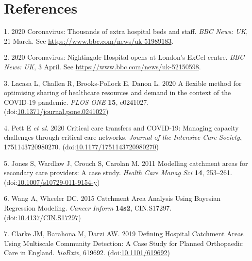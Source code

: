 \documentclass[
]{article}
\begin{document}
\hypertarget{references}{%
\section{References}\label{references}}

\hypertarget{refs}{}
\leavevmode\hypertarget{ref-CoronavirusThousandsExtra2020}{}%
1. 2020 Coronavirus: Thousands of extra hospital beds and staff.
\emph{BBC News: UK}, 21 March. See
\url{https://www.bbc.com/news/uk-51989183}.

\leavevmode\hypertarget{ref-CoronavirusNightingaleHospital2020}{}%
2. 2020 Coronavirus: Nightingale Hospital opens at London's ExCel
centre. \emph{BBC News: UK}, 3 April. See
\url{https://www.bbc.com/news/uk-52150598}.

\leavevmode\hypertarget{ref-lacasaFlexibleMethodOptimising2020}{}%
3. Lacasa L, Challen R, Brooks-Pollock E, Danon L. 2020 A flexible
method for optimising sharing of healthcare resources and demand in the
context of the COVID-19 pandemic. \emph{PLOS ONE} \textbf{15}, e0241027.
(doi:\href{https://doi.org/10.1371/journal.pone.0241027}{10.1371/journal.pone.0241027})

\leavevmode\hypertarget{ref-pettCriticalCareTransfers2020}{}%
4. Pett E \emph{et al.} 2020 Critical care transfers and COVID-19:
Managing capacity challenges through critical care networks.
\emph{Journal of the Intensive Care Society}, 1751143720980270.
(doi:\href{https://doi.org/10.1177/1751143720980270}{10.1177/1751143720980270})

\leavevmode\hypertarget{ref-jonesModellingCatchmentAreas2011}{}%
5. Jones S, Wardlaw J, Crouch S, Carolan M. 2011 Modelling catchment
areas for secondary care providers: A case study. \emph{Health Care
Manag Sci} \textbf{14}, 253--261.
(doi:\href{https://doi.org/10.1007/s10729-011-9154-y}{10.1007/s10729-011-9154-y})

\leavevmode\hypertarget{ref-wangCatchmentAreaAnalysis2015}{}%
6. Wang A, Wheeler DC. 2015 Catchment Area Analysis Using Bayesian
Regression Modeling. \emph{Cancer Inform} \textbf{14s2}, CIN.S17297.
(doi:\href{https://doi.org/10.4137/CIN.S17297}{10.4137/CIN.S17297})

\leavevmode\hypertarget{ref-clarkeDefiningHospitalCatchment2019}{}%
7. Clarke JM, Barahona M, Darzi AW. 2019 Defining Hospital Catchment
Areas Using Multiscale Community Detection: A Case Study for Planned
Orthopaedic Care in England. \emph{bioRxiv}, 619692.
(doi:\href{https://doi.org/10.1101/619692}{10.1101/619692})
\end{document}
